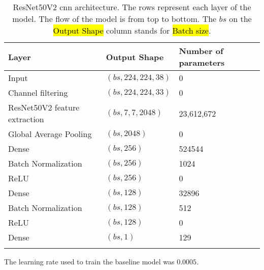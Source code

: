 \begin{longtable}{m{\mylengtha} | m{\mylengthb} | m{\mylengthc}}
    \hline
    Layer & Output Shape & Number of parameters \\
    \hline
    Input & $(bs, 224, 224, 38)$ & 0 \\
    \hline
    Channel filtering & $(bs, 224, 224, 33)$ & 0 \\
    \hline
    ResNet50V2 feature extraction & $(bs, 7, 7, 2048)$ & 23,612,672 \\
    \hline
    Global Average Pooling & $(bs, 2048)$ & 0 \\
    \hline
    Dense & $(bs, 256)$ & 524544 \\
    \hline
    Batch Normalization & $(bs, 256)$ & 1024 \\
    \hline
    ReLU & $(bs, 256)$ & 0 \\
    \hline
    Dense & $(bs, 128)$ & 32896 \\
    \hline
    Batch Normalization & $(bs, 128)$ & 512 \\
    \hline
    ReLU & $(bs, 128)$ & 0 \\
    \hline
    Dense & $(bs, 1)$ & 129 \\
    \hline
  \caption{ResNet50V2 \gls{cnn} architecture. The rows represent each layer of the model. The flow of the model is from top to bottom. The $bs$ on the \hl{Output Shape} column stands for \hl{Batch size}.}
  \label{table:metho:models:RN50V2}
\end{longtable}

The learning rate used to train the baseline model was $0.0005$.
